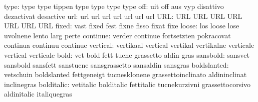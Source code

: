                      type: type                      type
                           tippen                    type
                           type                      type
                           type
                      off: uit                       off
                           aus                       vyp
                           disattivo                 dezactivat
                           desactive
                      url: url                       url
                           url                       url
                           url                       url
                           url
                      URL: URL                       URL
                           URL                       URL
                           URL                       URL
                           URL
                    fixed: vast                      fixed
                           fest                      fixne
                           fisso                     fixat
                           fixe
                    loose: los                       loose
                           lose                      uvolnene
                           lento                     larg
                           perte
                 continue: verder                    continue
                           fortsetzten               pokracovat
                           continua                  continuu
                           continue
                 vertical: vertikaal                 vertical
                           vertikal                  vertikalne
                           verticale                 vertical
                           verticale
                     bold: vet                       bold
                           fett                      tucne
                           grassetto                 aldin
                           gras
                 sansbold: sansvet                   sansbold
                           sansfett                  sanstucne
                           sansgrassetto             sansaldin
                           sansgras
              boldslanted: vetschuin                 boldslanted
                           fettgeneigt               tucnesklonene
                           grassettoinclinato        aldininclinat
                           inclinegras
               bolditalic: vetitalic                 bolditalic
                           fettitalic                tucnekurzivni
                           grassettocorsivo          aldinitalic
                           italiquegras
